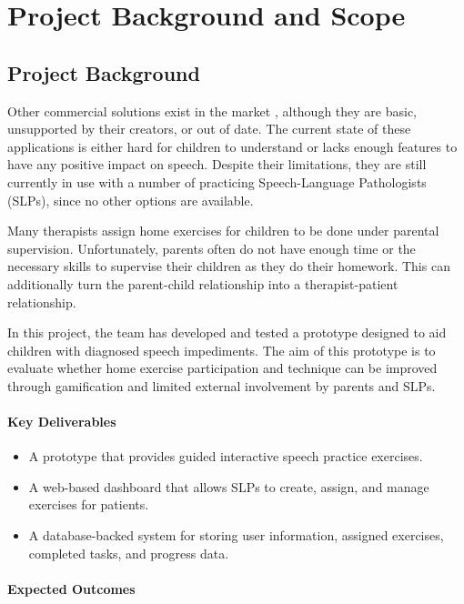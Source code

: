 \chapter{Project Background and Scope}
\label{ch:project-background}

\section{Project Background}
\label{sec:project-background}

Other commercial solutions exist in the market \cite{cboard}, although they are basic, unsupported by their creators, or out of date. The current state of these applications is either hard for children to understand or lacks enough features to have any positive impact on speech. Despite their limitations, they are still currently in use with a number of practicing Speech-Language Pathologists (SLPs), since no other options are available.

Many therapists assign home exercises for children to be done under parental supervision. Unfortunately, parents often do not have enough time or the necessary skills to supervise their children as they do their homework. This can additionally turn the parent-child relationship into a therapist-patient relationship.

In this project, the team has developed and tested a prototype designed to aid children with diagnosed speech impediments. The aim of this prototype is to evaluate whether home exercise participation and technique can be improved through gamification and limited external involvement by parents and SLPs.

\subsubsection*{Key Deliverables}

\begin{itemize}
    \item A prototype that provides guided interactive speech practice exercises.
    \item A web-based dashboard that allows SLPs to create, assign, and manage exercises for patients.
    \item A database-backed system for storing user information, assigned exercises, completed tasks, and progress data.
\end{itemize}

\subsubsection*{Expected Outcomes}


